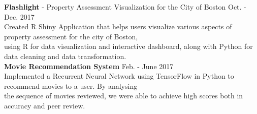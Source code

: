\documentclass[a4paper]{article}
\newcommand{\myline}{\par
  \kern2pt %
  \hrule height 0.5pt
  \kern2pt %
}
\newcommand{\mybullet}{
	\indent \textbullet \hspace*{2mm}
}
\begin{document}
			\noindent
			\textbf{Flashlight} - Property Assessment Visualization for the City of Boston 
			\hfill Oct. - Dec. 2017 \\
			\mybullet Created R Shiny Application that helps users visualize various aspects of 
			property assessment for the city of  Boston, \\ \hspace*{9mm} using 
			R for data visualization and interactive dashboard, along with Python for data cleaning 
			and data transformation. \\
			
			\noindent
			\textbf{Movie Recommendation System} \hfill Feb. - June 2017\\
			\mybullet Implemented a Recurrent Neural Network using TensorFlow in Python to recommend 
      movies to a user. By analysing \\ \hspace*{9mm} the sequence of movies reviewed, we were 
      able to achieve high scores both in accuracy and peer review. \\ 

	
		
	

		
\end{document}
